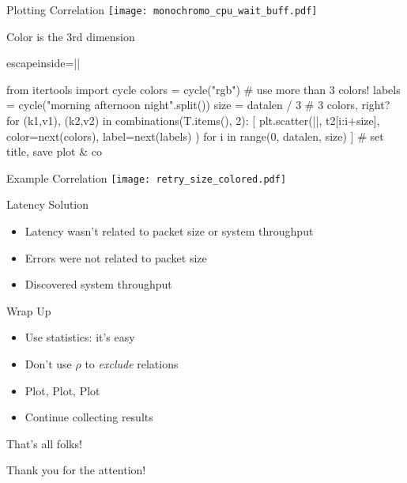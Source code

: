 \documentclass{beamer}[10]
\begin{document}
\begin{pyframe}{Plotting Correlation}
\texttt{[image: monochromo\_cpu\_wait\_buff.pdf]}
\end{pyframe}

\begin{pyframe}{Color is the 3rd dimension}
\begin{pycode*}{escapeinside=||}

from itertools import cycle
colors = cycle("rgb")   # use more than 3 colors!
labels = cycle("morning afternoon night".split())
size = datalen / 3      # 3 colors, right?
for (k1,v1), (k2,v2) in combinations(T.items(), 2):
  [    plt.scatter(||, t2[i:i+size],
        color=next(colors),
        label=next(labels)
        ) for i in range(0, datalen, size) ]
  # set title, save plot & co


\end{pycode*}
\end{pyframe}

\iffalse
\begin{pyframe}{Example Correlation}
\texttt{[image: latency\_thruput\_colored.pdf]}
\end{pyframe}
\fi

\begin{pyframe}{Example Correlation}
\texttt{[image: retry\_size\_colored.pdf]}
\end{pyframe}


\begin{pyframe}{Latency Solution}
\begin{itemize}
\item Latency wasn't related to packet size or system throughput
\item Errors were not related to packet size
\item Discovered system throughput
\end{itemize}
\end{pyframe}


\begin{pyframe}{Wrap Up}
\begin{itemize}
\item Use statistics: it's easy
\item Don't use $\rho$ to \emph{exclude} relations
\item Plot, Plot, Plot
\item Continue collecting results
\end{itemize}
\end{pyframe}

\begin{pyframe}{That's all folks!}
\begin{center}
Thank you for the attention! \\\\
\insertauthor
\end{center}
\end{pyframe}
\end{document}
